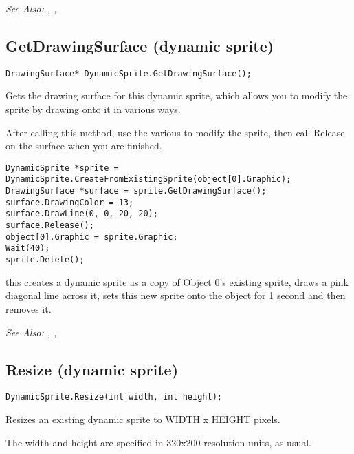 \it{See Also:} ,
,


\subsection{GetDrawingSurface (dynamic sprite)}\label{DynamicSprite.GetDrawingSurface}%

\begin{verbatim}
DrawingSurface* DynamicSprite.GetDrawingSurface();
\end{verbatim}
Gets the drawing surface for this dynamic sprite, which allows you to modify the sprite by
drawing onto it in various ways.

After calling this method, use the various  to modify the
sprite, then call Release on the surface when you are finished.

\begin{verbatim}
DynamicSprite *sprite = DynamicSprite.CreateFromExistingSprite(object[0].Graphic);
DrawingSurface *surface = sprite.GetDrawingSurface();
surface.DrawingColor = 13;
surface.DrawLine(0, 0, 20, 20);
surface.Release();
object[0].Graphic = sprite.Graphic;
Wait(40);
sprite.Delete();
\end{verbatim}
this creates a dynamic sprite as a copy of Object 0's existing sprite, draws
a pink diagonal line across it, sets this new sprite onto the object for 1 second
and then removes it.

\it{See Also:} ,
,


\subsection{Resize (dynamic sprite)}\label{DynamicSprite.Resize}%

\begin{verbatim}
DynamicSprite.Resize(int width, int height);
\end{verbatim}
Resizes an existing dynamic sprite to WIDTH x HEIGHT pixels.

The width and height are specified in 320x200-resolution units, as usual.

